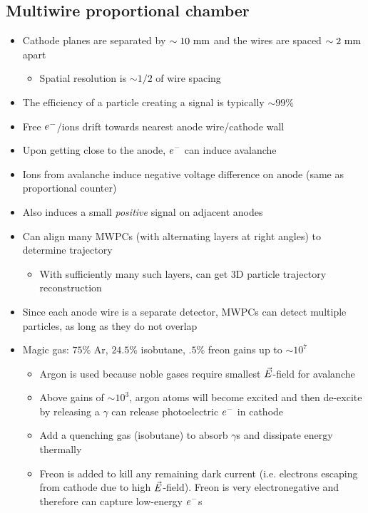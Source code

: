 \subsection{Multiwire proportional chamber}
\begin{itemize}
  \item Cathode planes are separated by $\sim 10~\text{mm}$ and the wires are spaced $\sim 2~\text{mm}$ apart
  \begin{itemize}
    \item Spatial resolution is $\sim 1/2$ of wire spacing
  \end{itemize}
  \item The efficiency of a particle creating a signal is typically $\sim 99\%$
  \item Free $e^{-}$/ions drift towards nearest anode wire/cathode wall
  \item Upon getting close to the anode, $e^{-}$ can induce avalanche
  \item Ions from avalanche induce negative voltage difference on anode (same as proportional counter)
  \item Also induces a small \emph{positive} signal on adjacent anodes
  \item Can align many MWPCs (with alternating layers at right angles) to determine trajectory
  \begin{itemize}
    \item With sufficiently many such layers, can get 3D particle trajectory reconstruction
  \end{itemize}
  \item Since each anode wire is a separate detector, MWPCs can detect multiple particles, as long as they do not overlap
  \item Magic gas: $75\%$ Ar, $24.5\%$ isobutane, $.5\%$ freon \thus gains up to $\sim 10^7$
  \begin{itemize}
    \item Argon is used because noble gases require smallest $\vec{E}$-field for avalanche
    \item Above gains of $\sim10^3$, argon atoms will become excited and then de-excite by releasing a $\gamma$ \thus can release photoelectric $e^{-}$ in cathode
    \item Add a quenching gas (isobutane) to absorb $\gamma$s and dissipate energy thermally
    \item Freon is added to kill any remaining dark current (i.e. electrons escaping from cathode due to high $\vec{E}$-field). Freon is very electronegative and therefore can capture low-energy $e^{-}$s

\end{itemize}
\end{itemize}
